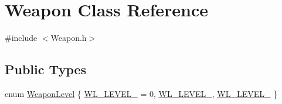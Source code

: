 \hypertarget{class_weapon}{
\section{Weapon Class Reference}
\label{db/de5/class_weapon}
}


{\ttfamily \#include $<$Weapon.h$>$}

\subsection*{Public Types}
\begin{DoxyCompactItemize}
\item 
enum \hyperlink{class_weapon_a72f39b8add8bdd807d7fe4337c07da08}{WeaponLevel} \{ \hyperlink{class_weapon_a72f39b8add8bdd807d7fe4337c07da08ac2a3392cc19560e56036c42dc8ec4b1d}{WL\_\-LEVEL\_} =  0, 
\hyperlink{class_weapon_a72f39b8add8bdd807d7fe4337c07da08aeed19eebb90475552d27cab4898a9263}{WL\_\-LEVEL\_}, 
\hyperlink{class_weapon_a72f39b8add8bdd807d7fe4337c07da08a6febe43cc8f5d6340bb5262954e74bfa}{WL\_\-LEVEL\_}
 \}
\end{DoxyCompactItemize}
